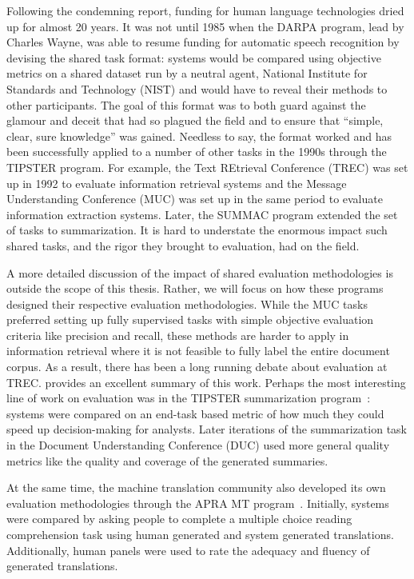 Following the condemning report, funding for human language technologies dried up for almost 20 years.
It was not until 1985 when the DARPA program, lead by Charles Wayne, was able to resume funding for automatic speech recognition by devising the shared task format: systems would be compared using objective metrics on a shared dataset run by a neutral agent, National Institute for Standards and Technology (NIST) and would have to reveal their methods to other participants.
The goal of this format was to both guard against the glamour and deceit that had so plagued the field and to ensure that ``simple, clear, sure knowledge'' was gained.
Needless to say, the format worked and has been successfully applied to a number of other tasks in the 1990s through the TIPSTER program.
For example, the Text REtrieval Conference (TREC) was set up in 1992 to evaluate information retrieval systems and the Message Understanding Conference (MUC) was set up in the same period to evaluate information extraction systems.
Later, the SUMMAC program extended the set of tasks to summarization.
It is hard to understate the enormous impact such shared tasks, and the rigor they brought to evaluation, had on the field.

A more detailed discussion of the impact of shared evaluation methodologies is outside the scope of this thesis.
Rather, we will focus on how these programs designed their respective evaluation methodologies.
While the MUC tasks preferred setting up fully supervised tasks with simple objective evaluation criteria like precision and recall, these methods are harder to apply in information retrieval where it is not feasible to fully label the entire document corpus.
As a result, there has been a long running debate about evaluation at TREC.\@
\citet{webber2010measurement} provides an excellent summary of this work.
Perhaps the most interesting line of work on evaluation was in the TIPSTER summarization program~\citep{mani1999tipster}:
  systems were compared on an end-task based metric of how much they could speed up decision-making for analysts.
Later iterations of the summarization task in the Document Understanding Conference (DUC) used more general quality metrics like the quality and coverage of the generated summaries.

At the same time, the machine translation community also developed its own evaluation methodologies through the APRA MT program~\citep{white1994arpa}.
Initially, systems were compared by asking people to complete a multiple choice reading comprehension task using human generated and system generated translations.
Additionally, human panels were used to rate the adequacy and fluency of generated translations.

